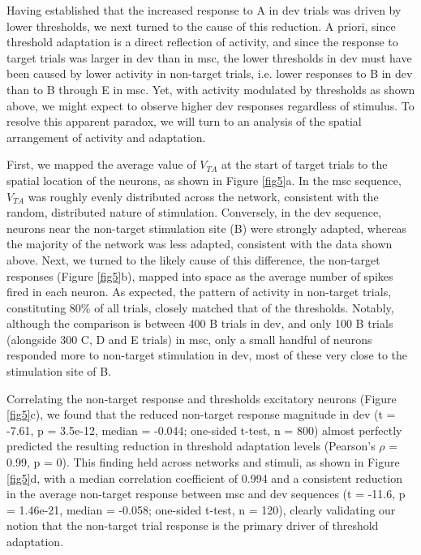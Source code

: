 \documentclass[pdflatex,referee,iicol,sn-basic]{sn-jnl}
\theoremstyle{thmstyleone}%
\theoremstyle{thmstyletwo}%
\theoremstyle{thmstylethree}%
\begin{document}
Having established that the increased response to A in dev trials was driven by lower thresholds, we next turned to the cause of this reduction. A priori, since threshold adaptation is a direct reflection of activity, and since the response to target trials was larger in dev than in msc, the lower thresholds in dev must have been caused by lower activity in non-target trials, i.e. lower responses to B in dev than to B through E in msc. Yet, with activity modulated by thresholds as shown above, we might expect to observe higher dev responses regardless of stimulus. To resolve this apparent paradox, we will turn to an analysis of the spatial arrangement of activity and adaptation.

First, we mapped the average value of $V_{TA}$ at the start of target trials to the spatial location of the neurons, as shown in Figure \ref{fig5}a. In the msc sequence, $V_{TA}$ was roughly evenly distributed across the network, consistent with the random, distributed nature of stimulation. Conversely, in the dev sequence, neurons near the non-target stimulation site (B) were strongly adapted, whereas the majority of the network was less adapted, consistent with the data shown above.
Next, we turned to the likely cause of this difference, the non-target responses (Figure \ref{fig5}b), mapped into space as the average number of spikes fired in each neuron. As expected, the pattern of activity in non-target trials, constituting 80\% of all trials, closely matched that of the thresholds. Notably, although the comparison is between 400 B trials in dev, and only 100 B trials (alongside 300 C, D and E trials) in msc, only a small handful of neurons responded more to non-target stimulation in dev, most of these very close to the stimulation site of B.

Correlating the non-target response and thresholds excitatory neurons (Figure \ref{fig5}c), we found that the reduced non-target response magnitude in dev (t = -7.61, p = 3.5e-12, median = -0.044; one-sided t-test, n = 800) almost perfectly predicted the resulting reduction in threshold adaptation levels (Pearson's $\rho$ = 0.99, p = 0).
This finding held across networks and stimuli, as shown in Figure \ref{fig5}d, with a median correlation coefficient of 0.994 and a consistent reduction in the average non-target response between msc and dev sequences (t = -11.6, p = 1.46e-21, median = -0.058; one-sided t-test, n = 120), clearly validating our notion that the non-target trial response is the primary driver of threshold adaptation.
\end{document}
